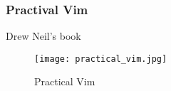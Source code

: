 \begin{frame}[fragile]
  \frametitle{Practival Vim}
  Drew Neil's book \cite{neil2015practical}
  \begin{figure}
    \centering
    \texttt{[image: practical\_vim.jpg]}
    \caption{Practical Vim}
    \label{fig:practical-vim}
  \end{figure}
\end{frame}
